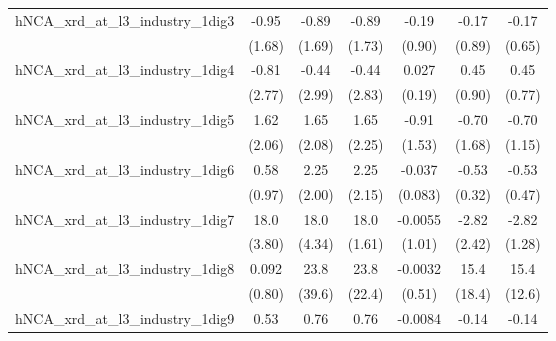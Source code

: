 {\begin{tabular}{l*{6}{c}}
\addlinespace
hNCA\_xrd\_at\_l3\_industry\_1dig3&       -0.95         &       -0.89         &       -0.89         &       -0.19         &       -0.17         &       -0.17         \\
                    &      (1.68)         &      (1.69)         &      (1.73)         &      (0.90)         &      (0.89)         &      (0.65)         \\
\addlinespace
hNCA\_xrd\_at\_l3\_industry\_1dig4&       -0.81         &       -0.44         &       -0.44         &       0.027         &        0.45         &        0.45         \\
                    &      (2.77)         &      (2.99)         &      (2.83)         &      (0.19)         &      (0.90)         &      (0.77)         \\
\addlinespace
hNCA\_xrd\_at\_l3\_industry\_1dig5&        1.62         &        1.65         &        1.65         &       -0.91         &       -0.70         &       -0.70         \\
                    &      (2.06)         &      (2.08)         &      (2.25)         &      (1.53)         &      (1.68)         &      (1.15)         \\
\addlinespace
hNCA\_xrd\_at\_l3\_industry\_1dig6&        0.58         &        2.25         &        2.25         &      -0.037         &       -0.53         &       -0.53         \\
                    &      (0.97)         &      (2.00)         &      (2.15)         &     (0.083)         &      (0.32)         &      (0.47)         \\
\addlinespace
hNCA\_xrd\_at\_l3\_industry\_1dig7&        18.0\sym{***}&        18.0\sym{***}&        18.0\sym{***}&     -0.0055         &       -2.82         &       -2.82\sym{**} \\
                    &      (3.80)         &      (4.34)         &      (1.61)         &      (1.01)         &      (2.42)         &      (1.28)         \\
\addlinespace
hNCA\_xrd\_at\_l3\_industry\_1dig8&       0.092         &        23.8         &        23.8         &     -0.0032         &        15.4         &        15.4         \\
                    &      (0.80)         &      (39.6)         &      (22.4)         &      (0.51)         &      (18.4)         &      (12.6)         \\
\addlinespace
hNCA\_xrd\_at\_l3\_industry\_1dig9&        0.53         &        0.76         &        0.76         &     -0.0084         &       -0.14         &       -0.14         \\

\end{tabular}}
